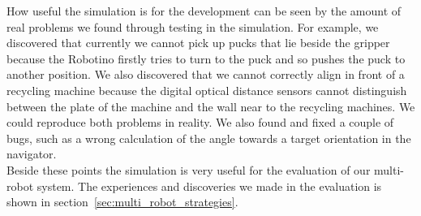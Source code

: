 How useful the simulation is for the development can be seen by the amount of real problems we found through testing in the simulation. For example, we discovered that currently we cannot pick up pucks that lie beside the gripper because the Robotino firstly tries to turn to the puck and so pushes the puck to another position. We also discovered that we cannot correctly align in front of a recycling machine because the digital optical distance sensors cannot distinguish between the plate of the machine and the wall near to the recycling machines. We could reproduce both problems in reality. We also found and fixed a couple of bugs, such as a wrong calculation of the angle towards a target orientation in the navigator.\\
Beside these points the simulation is very useful for the evaluation of our multi-robot system. The experiences and discoveries we made in the evaluation is shown in section~\ref{sec:multi_robot_strategies}.\\


